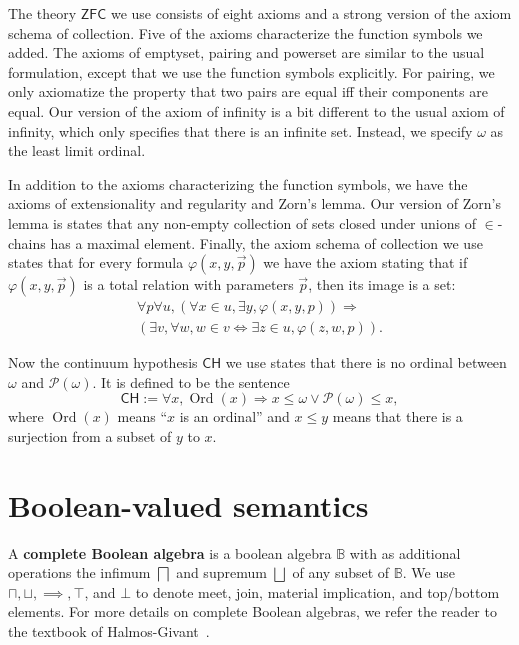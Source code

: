 \documentclass[sigplan,10pt,review, anonymous]{acmart}
\newcommand{\B}{\mathbb{B}}
\newcommand{\ZFC}{\mathsf{ZFC}}
\newcommand{\CH}{\mathsf{CH}}
\theoremstyle{definition}
\DeclareMathOperator{\Ord}{Ord}
\begin{document}
The theory \(\ZFC\) we use consists of eight axioms and a strong version of the axiom schema of collection.
Five of the axioms characterize the function symbols we added.
The axioms of emptyset, pairing and powerset are similar to the usual formulation, except that we use the function symbols explicitly.
For pairing, we only axiomatize the property that two pairs are equal iff their components are equal.
Our version of the axiom of infinity is a bit different to the usual axiom of infinity, which only specifies that there is an infinite set. Instead, we specify $\omega$ as the least limit ordinal.

In addition to the axioms characterizing the function symbols, we have the axioms of extensionality and regularity and Zorn's lemma.
Our version of Zorn's lemma is states that any non-empty collection of sets closed under unions of $\in$-chains has a maximal element.
Finally, the axiom schema of collection we use states that for every formula \(\varphi(x,y,\vec p)\) we have the axiom stating that if \(\varphi(x,y,\vec p)\) is a total relation with parameters \(\vec p\), then its image is a set:
\begin{gather*}
\forall p \forall u, (\forall x \in u, \exists y, \varphi(x,y,p)) \Rightarrow\\
(\exists v, \forall w, w \in v \iff \exists z \in u, \varphi(z,w,p)).
\end{gather*}

Now the continuum hypothesis \(\CH\) we use states that there is no ordinal between \(\omega\) and \(\mathcal{P}(\omega)\). It is defined to be the sentence
\[\CH:=\forall x, \Ord(x) \Rightarrow x \le \omega \vee \mathcal{P}(\omega) \le x,\]
where \(\Ord(x)\) means ``\(x\) is an ordinal'' and \(x \le y\) means that there is a surjection from a subset of \(y\) to \(x\).

\section{Boolean-valued semantics}
\label{section:boolean-semantics}

A \textbf{complete Boolean algebra} is a boolean algebra $\B$ with as additional operations the infimum $\bigsqcap$ and supremum $\bigsqcup$ of any subset of $\B$.
We use $\sqcap, \sqcup, \implies, \top$, and $\bot$ to denote meet, join, material implication, and top/bottom elements.
For more details on complete Boolean algebras, we refer the reader to the textbook of Halmos-Givant~\cite{givant2008introduction}.
\end{document}
